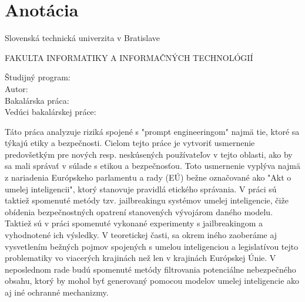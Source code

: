 \thispagestyle{empty}

\section*{Anotácia}

\begin{minipage}[t]{1\columnwidth}%
Slovenská technická univerzita v Bratislave

FAKULTA INFORMATIKY A INFORMAČNÝCH TECHNOLÓGIÍ

Študijný program: \hspace{1.4cm} \myStudyProgramSK\\

\noindent
Autor: \hspace{3.5cm} \myName \\
Bakalárska práca: \hspace{1.5cm} \myTitleSK \\
Vedúci bakalárskej práce: \hspace{0.12cm} \mySupervisor \\
\noindent
\myDateSKBPOne%
\end{minipage}

\bigskip{}

Táto práca analyzuje riziká spojené s "prompt engineeringom" najmä tie, ktoré sa týkajú etiky a bezpečnosti. Cielom tejto práce je vytvoriť usmernenie predovšetkým pre nových resp. neskúsených používateľov v tejto oblasti, ako by sa mali správať v súlade s etikou a bezpečnosťou. Toto usmernenie vyplýva najmä z nariadenia Európskeho parlamentu a rady (EÚ) bežne označované ako "Akt o umelej inteligencii", ktorý stanovuje pravidlá etického správania. V práci sú taktiež spomenuté metódy tzv. jailbreakingu systémov umelej inteligencie, čiže obídenia bezpečnostných opatrení stanovených vývojárom daného modelu. Taktiež sú v práci spomenuté vykonané experimenty s jailbreakingom a vyhodnotené ich výsledky. V teoretickej časti, sa okrem iného zaoberáme aj vysvetlením bežných pojmov spojených s umelou inteligenciou a legislatívou tejto problematiky vo viacerých krajinách než len v krajinách Európskej Únie. V neposlednom rade budú spomenuté metódy filtrovania potenciálne nebezpečného obsahu, ktorý by mohol byť generovaný pomocou modelov umelej inteligencie ako aj iné ochranné mechanizmy.


\newpage{}\thispagestyle{empty}

\newpage
\thispagestyle{empty}
\mbox{}
\newpage


